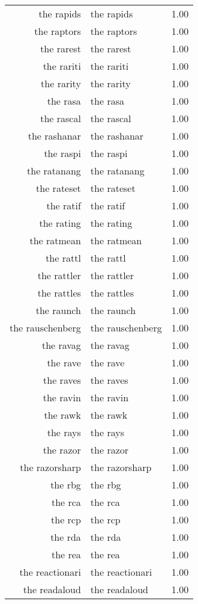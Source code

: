 \begin{table}[ht]
\begin{tabular}{rlr}
  the rapids & the rapids & 1.00 \\ 
  the raptors & the raptors & 1.00 \\ 
  the rarest & the rarest & 1.00 \\ 
  the rariti & the rariti & 1.00 \\ 
  the rarity & the rarity & 1.00 \\ 
  the rasa & the rasa & 1.00 \\ 
  the rascal & the rascal & 1.00 \\ 
  the rashanar & the rashanar & 1.00 \\ 
  the raspi & the raspi & 1.00 \\ 
  the ratanang & the ratanang & 1.00 \\ 
  the rateset & the rateset & 1.00 \\ 
  the ratif & the ratif & 1.00 \\ 
  the rating & the rating & 1.00 \\ 
  the ratmean & the ratmean & 1.00 \\ 
  the rattl & the rattl & 1.00 \\ 
  the rattler & the rattler & 1.00 \\ 
  the rattles & the rattles & 1.00 \\ 
  the raunch & the raunch & 1.00 \\ 
  the rauschenberg & the rauschenberg & 1.00 \\ 
  the ravag & the ravag & 1.00 \\ 
  the rave & the rave & 1.00 \\ 
  the raves & the raves & 1.00 \\ 
  the ravin & the ravin & 1.00 \\ 
  the rawk & the rawk & 1.00 \\ 
  the rays & the rays & 1.00 \\ 
  the razor & the razor & 1.00 \\ 
  the razorsharp & the razorsharp & 1.00 \\ 
  the rbg & the rbg & 1.00 \\ 
  the rca & the rca & 1.00 \\ 
  the rcp & the rcp & 1.00 \\ 
  the rda & the rda & 1.00 \\ 
  the rea & the rea & 1.00 \\ 
  the reactionari & the reactionari & 1.00 \\ 
  the readaloud & the readaloud & 1.00 \\ 

\end{tabular}
\end{table}
